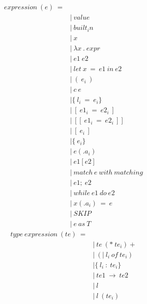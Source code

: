 \documentclass[10pt,a4paper]{article}
\begin{document}
\begin{align*}
expression\ (e)\ = 
\\
 \ &|\ value                            \tag{values}
\\
 \ &|\ built_in                         \tag{built-in\ function}
\\
 \ &|\ x                                \tag{variables}
\\
 \ &|\ \lambda x\ .\ expr                        \tag{lambda}
\\
 \ &|\ e1\ e2                            \tag{application}
\\
 \ &|\ let\ x\ =\ e1\ in\ e2                 \tag{let\ in}
\\
 \ &|\ (\ e_i\ )                          \tag{tuple}
\\
 \ &|\ c\ e                              \tag{constructor}
\\
 \ &| \{\ l_i\ =\ e_i \}                    \tag{record}
\\
 \ &|\ [\ e1_i\ =\ e2_i\ ]                  \tag{map}
\\
 \ &|\ [[\ e1_i\ =\ e2_i\ ]]                \tag{big\ map}
\\
 \ &|\ [\ e_i\ ]                          \tag{list}
\\
 \ &| \{\ e_i \}                          \tag{set}
\\
 \ &|\ e(.a_i)                          \tag{accessor}
\\
 \ &|\ e1[e2]                           \tag{look\ up}
\\
 \ &|\ match\ e\ with\ matching            \tag{matching}
\\
 \ &|\ e1;\ e2                           \tag{sequence}
\\
 \ &|\ while\ e1\ do\ e2                   \tag{loop}
\\
 \ &|\ x(.a_i)\ =\ e                      \tag{assign}
\\
 \ &|\ SKIP                             \tag{skip}
\\
 \ &|\ e\ as\ T                           \tag{ascription}
\end{align*}
\begin{align*}
type\ expression\ (te)\ =
\\
 \ &|\ te\ (*\ te_i)+                     \tag{type\ of\ tuple}
\\
 \ &|\ (|\ l_i\ of\ te_i)                  \tag{type\ of\ sum}
\\
 \ &| \{\ l_i\ :\ te_i \}                   \tag{type\ of\ record}
\\
 \ &|\ te1\ \rightarrow \ te2                       \tag{type\ of\ function}
\\
 \ &|\ l                                \tag{type\ of\ variable}
\\
 \ &|\ l\ (te_i)                         \tag{type\ of\ built\ in\ function}
\end{align*}
\end{document}
